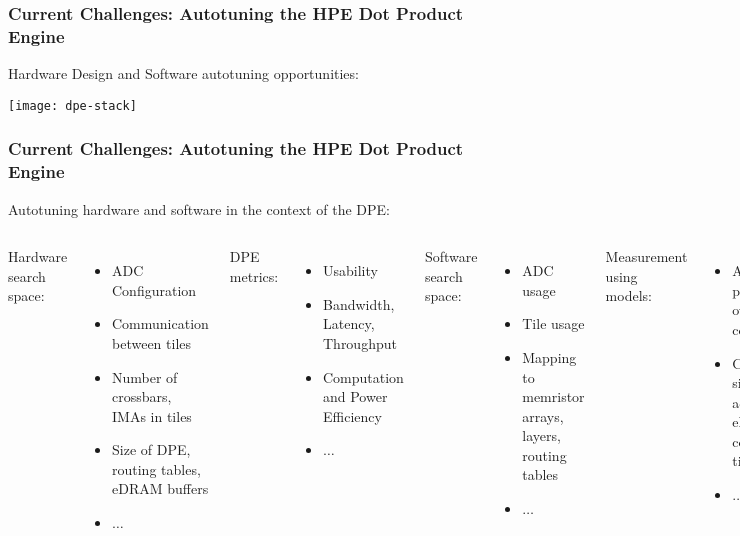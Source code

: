 \documentclass[10pt, compress, aspectratio=169, xcolor=table]{beamer}
\begin{document}
\begin{frame}
    \frametitle{Current Challenges: Autotuning the HPE Dot Product Engine}
    \alert{Hardware Design} and \alert{Software} autotuning opportunities:

    \begin{center}
        \texttt{[image: dpe-stack]}
    \end{center}
\end{frame}

\begin{frame}
    \frametitle{Current Challenges: Autotuning the HPE Dot Product Engine}
    Autotuning \alert{hardware and software} in the context of the \alert{DPE}:

    \begin{columns}[T,onlytextwidth]
        \alert{Hardware search space}:
        \begin{itemize}
            \item ADC Configuration
            \item Communication between tiles
            \item Number of crossbars, IMAs in tiles
            \item Size of DPE, routing tables, eDRAM buffers
            \item $\dots$
        \end{itemize}

        \alert{DPE metrics}:
        \begin{itemize}
            \item Usability
            \item Bandwidth, Latency, Throughput
            \item Computation and Power Efficiency
            \item $\dots$
        \end{itemize}

        \alert{Software search space}:
        \begin{itemize}
            \item ADC usage
            \item Tile usage
            \item Mapping to memristor arrays, layers, routing tables
            \item $\dots$
        \end{itemize}

        \alert{Measurement using models}:
        \begin{itemize}
            \item Area and power overhead for components
            \item Cycle accurate simulations for accessing eDRAM, communicating tiles
            \item $\dots$
        \end{itemize}
    \end{columns}

    \vfill
\end{frame}
\end{document}
